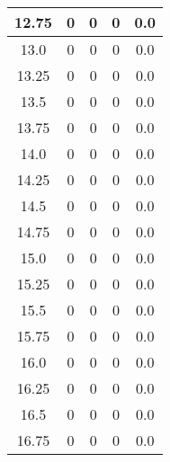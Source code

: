 \documentclass[letterpaper, 12pt]{article}
\begin{document}
\begin{longtable}{|c|c|c|c|c|}
\hline
12.75 & 0 & 0 & 0 & 0.0 \\
\hline
13.0 & 0 & 0 & 0 & 0.0 \\
\hline
13.25 & 0 & 0 & 0 & 0.0 \\
\hline
13.5 & 0 & 0 & 0 & 0.0 \\
\hline
13.75 & 0 & 0 & 0 & 0.0 \\
\hline
14.0 & 0 & 0 & 0 & 0.0 \\
\hline
14.25 & 0 & 0 & 0 & 0.0 \\
\hline
14.5 & 0 & 0 & 0 & 0.0 \\
\hline
14.75 & 0 & 0 & 0 & 0.0 \\
\hline
15.0 & 0 & 0 & 0 & 0.0 \\
\hline
15.25 & 0 & 0 & 0 & 0.0 \\
\hline
15.5 & 0 & 0 & 0 & 0.0 \\
\hline
15.75 & 0 & 0 & 0 & 0.0 \\
\hline
16.0 & 0 & 0 & 0 & 0.0 \\
\hline
16.25 & 0 & 0 & 0 & 0.0 \\
\hline
16.5 & 0 & 0 & 0 & 0.0 \\
\hline
16.75 & 0 & 0 & 0 & 0.0 \\
\hline
\end{longtable}
\end{document}
